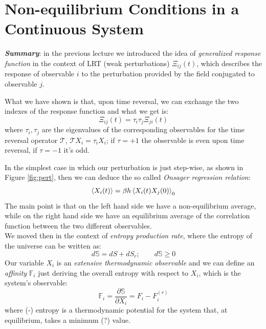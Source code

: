 \documentclass[\main/main.tex]{subfiles}
\begin{document}
\section{Non-equilibrium Conditions in a Continuous System}

\textit{\textbf{Summary}}: in the previous lecture we introduced the idea of \textit{generalized response function} in the context of LRT (weak perturbations) $\Xi_{ij}(t)$, which describes the response of observable $i$ to the perturbation provided by the field conjugated to observable $j$. 

What we have shown is that, upon time reversal, we can exchange the two indexes of the response function and what we get is:
\begin{equation}
    \Xi_{ij}(t)=\tau_i\tau_j\Xi_{ji}(t)
\end{equation}
where $\tau_i,\tau_j$ are the eigenvalues of the corresponding observables for the time reversal operator $\mathcal{T}$, $\mathcal{T}X_i=\tau_i X_i$; if $\tau=+1$ the observable is even upon time reversal, if $\tau=-1$ it's odd.

In the simplest case in which our perturbation is just step-wise, as shown in Figure \ref{fig:pert}, then we can deduce the so called \textit{Onsager regression relation}:
\begin{equation}
    \left\langle X_i(t) \right\rangle=\beta h\left\langle X_i(t)X_j(0) \right\rangle_0
    \label{eq:ons}
\end{equation}
The main point is that on the left hand side we have a non-equilibrium average, while on the right hand side we have an equilibrium average of the correlation function between the two different observables. \\

We moved then in the context of \textit{entropy production rate}, where the entropy of the universe can be written as:
\begin{equation}
    d\mathbb{S}=dS+dS_r; \qquad d\mathbb{S}\geq 0
\end{equation}
Our variable $X_i$ is an \textit{extensive thermodynamic observable} and we can define an \textit{affinity} $\mathbb{F}_i$ just deriving the overall entropy with respect to $X_i$, which is the system's observable:
\begin{equation}
    \mathbb{F}_i=\frac{\partial \mathbb{S}}{\partial X_i}=F_i-F_i^{(r)}
\end{equation}
where (-) entropy is a thermodynamic potential for the system that, at equilibrium, takes a minimum (?) value.\\
\end{document}
